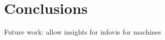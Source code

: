 \documentclass[journal]{vgtc}                %
\begin{document}
\section{Conclusions}

Future work: allow insights for infovis for machines



%

%
%
%


\end{document}
